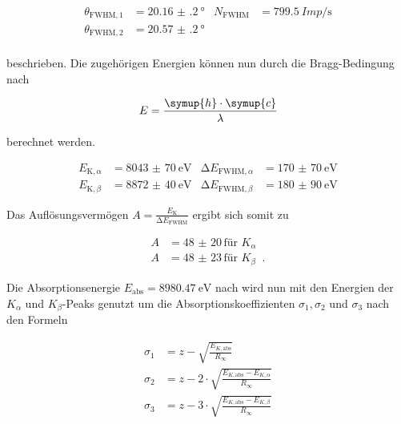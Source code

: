         \begin{align*}
            \theta_{\text{FWHM}, 1} &= \SI{20.16(20)}{\degree} & N_{\text{FWHM}} &= \SI{799.5}{Imp\per\second} \\
            \theta_{\text{FWHM}, 2} &= \SI{20.57(20)}{\degree}  \\
        \end{align*}

        \noindent beschrieben. Die zugehörigen Energien können nun durch die Bragg-Bedingung nach 

        \begin{equation}
            E = \frac{\symup{h} \cdot \symup{c}}{\lambda} 
        \end{equation}

        \noindent berechnet werden.

        \begin{align*}
            E_{\text{K}, \alpha} &= \SI{8043(70)}{\electronvolt} & \increment E_{\text{FWHM}, \alpha } &= \SI{170(70)}{\electronvolt}\\
            E_{\text{K}, \beta} &= \SI{8872(40)}{\electronvolt}  & \increment E_{\text{FWHM}, \beta } &= \SI{180(90)}{\electronvolt}
        \end{align*}
        
        \noindent Das Auflösungsvermögen $A = \frac{E_{\text{K}}}{\increment E_{\text{FWHM}}}$ ergibt sich somit zu

        \begin{align*}
          A&= \num{48(20)}\, \text{für } K_{\alpha}\\
          A&= \num{48(23)}\, \text{für }  K_{\beta} \; \; \text{.}
        \end{align*}

        \noindent Die Absorptionsenergie $E_{\text{abs}} = \SI{8980.47}{\electronvolt}$ nach \cite{E_abs} wird nun mit den Energien der 
        $K_{\alpha}$ und $K_{\beta}$-Peaks genutzt um die Absorptionskoeffizienten $\sigma_1, \sigma_2$ und $\sigma_3$ nach den Formeln

        \begin{align}
            \sigma_1 &= z - \sqrt{\frac{E_{K,\text{abs}}}{R_{\infty}}} \label{eq:sigma1} \\
            \sigma_2 &= z - 2 \cdot \sqrt{\frac{E_{K,\text{abs}} - E_{K, \alpha}}{R_{\infty}}} \label{eq:sigma2} \\
            \sigma_3 &= z - 3 \cdot \sqrt{\frac{E_{K,\text{abs}} - E_{K, \beta}}{R_{\infty}}} \label{eq:sigma3} 
        \end{align}
        
